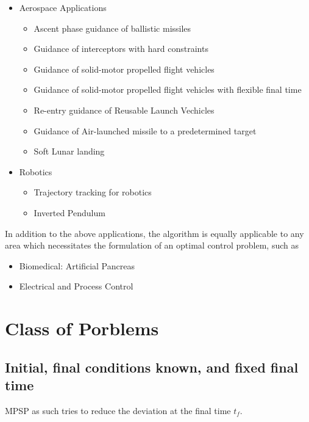 \documentclass[12pt]{article}
\begin{document}
\begin{itemize}
\item Aerospace Applications
	\begin{itemize}
		 \item Ascent phase guidance of ballistic missiles \cite{padhi2009model}
		 \item Guidance of interceptors with hard constraints \cite{dwivedi2011suboptimal,mondal2018angle}
		\item Guidance of solid-motor propelled flight vehicles \cite{kothari2010nonlinear}
		\item Guidance of solid-motor propelled flight vehicles with flexible final time  \cite{maity2016robust}
		\item Re-entry guidance of Reusable Launch Vechicles \cite{chawla2010suboptimal,halbe2014robust}
		\item Guidance of Air-launched missile to a predetermined target \cite{oza2012impact}
		\item Soft Lunar landing \cite{Sachan2019}
	\end{itemize}
\item Robotics
	\begin{itemize}
		\item Trajectory tracking for robotics \cite{kumar2019model}
		\item Inverted Pendulum \cite{mathavaraj2019unscented}
	\end{itemize}

\end{itemize}

In addition to the above applications, the algorithm is equally applicable to any area which necessitates the formulation of an optimal control problem, such as
\begin{itemize}
\item Biomedical: Artificial Pancreas
\item Electrical and Process Control
	
\end{itemize}

\iffalse
\section{Class of Porblems}
\subsection{Initial, final conditions known, and fixed final time}
MPSP as such tries to reduce the deviation at the final time $t_{f}$. 
\end{document}
